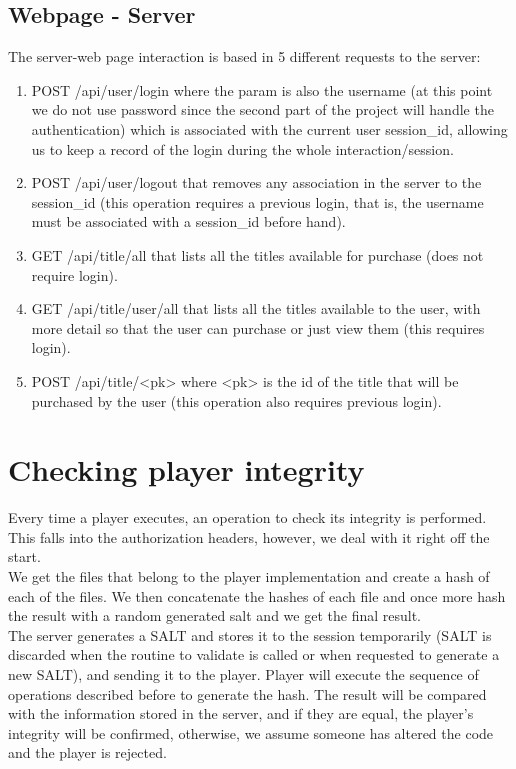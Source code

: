 \documentclass[11pt,a4paper]{report}
\begin{document}
\subsection{Webpage - Server}
The server-web page interaction is based in 5 different requests to the server:
\begin{enumerate}
\item POST  /api/user/login where the param is also the username (at this point we do not use password since the second part of the project will handle the authentication)  which is associated with the current user session\_id, allowing us to keep a record of the login during the whole interaction/session.
\item POST  /api/user/logout that removes any association in the server to the session\_id (this operation requires a previous login, that is, the username must be associated with a session\_id before hand).
\item GET   /api/title/all that lists all the titles available for purchase (does not require login).
\item GET   /api/title/user/all that lists all the titles available to the user, with more detail so that the user can purchase or just view them (this requires login).
\item POST  /api/title/<pk> where <pk> is the id of the title that will be purchased by the user (this operation also requires previous login).
\end{enumerate}

\section{Checking player integrity}
\label{sec:integrity}
Every time a player executes, an operation to check its integrity is performed. This falls into the authorization headers, however, we deal with it right off the start.\\

We get the files that belong to the player implementation and create a hash of each of the files. We then concatenate the hashes of each file and once more hash the result with a random generated salt and we get the final result.\\

The server generates a SALT and stores it to the session temporarily (SALT is discarded when the routine to validate is called or when requested to generate a new SALT), and sending it to the player. Player will execute the sequence of operations described before to generate the hash. The result will be compared with the information stored in the server, and if they are equal, the player's integrity will be confirmed, otherwise, we assume someone has altered the code and the player is rejected.
\end{document}
